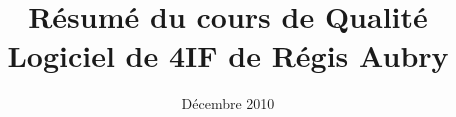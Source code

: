 \documentclass[a4paper]{report}
\title{Résumé du cours de Qualité Logiciel de 4IF de Régis Aubry}
\date{Décembre 2010}
\begin{document}
\maketitle

\vfill
\pagebreak

\tableofcontents

\vfill
\pagebreak

    
    
    
    
    
    
    
    
    
    
    
\end{document}
